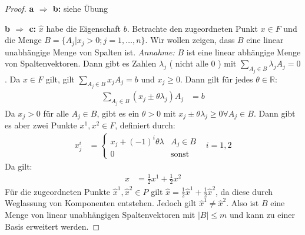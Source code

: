 \begin{proof}

\textbf{a $\Rightarrow$ b:} siehe Übung

\textbf{b $\Rightarrow$ c:}
$\hat{x}$ habe die Eigenschaft $b$.
Betrachte den zugeordneten Punkt $x \in F$ und die Menge $B= \{A_j | x_j > 0; j=1,\dotsc,n \}$.
Wir wollen zeigen, dass $B$ eine linear unabhängige Menge von Spalten ist. \newline
\textit{Annahme:} $B$ ist eine linear abhängige Menge von Spaltenvektoren.\newline
Dann gibt es Zahlen $\lambda_j$ ( nicht alle 0 ) mit $\sum_{A_j \in B} \lambda_j A_j = 0$. Da $x \in F$ gilt, gilt  $\sum_{A_j \in B} x_j A_j = b$ und $x_j \geq 0$. Dann gilt für jedes $\theta \in \mathbb R$:
\begin{align*}
\sum_{A_j \in B} (x_j \pm \theta\lambda_j) A_j &= b
\end{align*}
Da $x_j > 0$ für alle $A_j \in B$, gibt es ein $\theta > 0$ mit $x_j \pm \theta \lambda_j \geq 0 \forall A_j \in B$. Dann gibt es aber zwei Punkte $x^1, x^2 \in F$, definiert durch:
\begin{align*}
x_j^i &= \begin{cases}
x_j + (-1)^i \theta \lambda & A_j \in B \\
0 &\text{sonst}
\end{cases}
& i=1,2
\end{align*}
Da gilt:
\begin{align*}
x &= \frac{1}{2} x^1 + \frac{1}{2} x^2 
\end{align*}
Für die zugeordneten Punkte $\hat{x}^1, \hat{x}^2 \in P$ gilt $
\hat{x} = \frac{1}{2} \hat{x}^1 + \frac{1}{2} \hat{x}^2$, da diese durch Weglassung von Komponenten entstehen. Jedoch gilt $\hat{x}^1 \neq \hat{x}^2$. Also ist $B$ eine Menge von linear unabhängigen Spaltenvektoren mit $\lvert B \rvert \leq m$ und kann zu einer Basis erweitert werden.


\end{proof}
